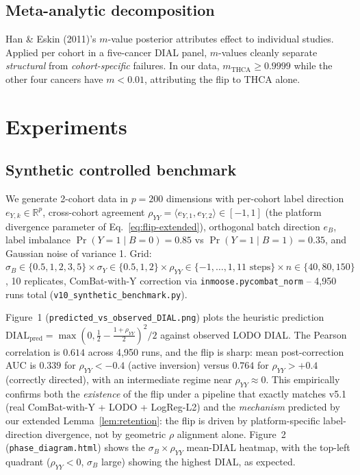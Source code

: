 \documentclass[letterpaper,11pt]{article}
\newcommand{\R}{\mathbb{R}}
\begin{document}
\subsection{Meta-analytic decomposition}
Han \& Eskin (2011)'s $m$-value posterior attributes effect to
individual studies.  Applied per cohort in a five-cancer DIAL panel,
$m$-values cleanly separate \emph{structural} from
\emph{cohort-specific} failures.  In our data,
$m_\text{THCA}\ge 0.9999$ while the other four cancers have
$m<0.01$, attributing the flip to THCA alone.

\section{Experiments}
\label{sec:exp}

\subsection{Synthetic controlled benchmark}
\label{sec:synth}
We generate 2-cohort data in $p=200$ dimensions with per-cohort
label direction $e_{Y,k}\in\R^{p}$, cross-cohort agreement
$\rho_{YY}=\langle e_{Y,1},e_{Y,2}\rangle\in[-1,1]$ (the platform
divergence parameter of Eq.~\eqref{eq:flip-extended}), orthogonal
batch direction $e_B$, label imbalance $\Pr(Y{=}1\mid B{=}0)=0.85$
vs $\Pr(Y{=}1\mid B{=}1)=0.35$, and Gaussian noise of variance 1.
Grid: $\sigma_B\in\{0.5,1,2,3,5\}\times\sigma_Y\in\{0.5,1,2\}\times
\rho_{YY}\in\{-1,\ldots,1,11\text{ steps}\}\times n\in\{40,80,150\}$,
10 replicates, ComBat-with-Y correction via
\texttt{inmoose.pycombat\_norm} -- 4{,}950 runs total
(\texttt{v10\_synthetic\_benchmark.py}).

Figure~1 (\texttt{predicted\_vs\_observed\_DIAL.png}) plots the
heuristic prediction $\mathrm{DIAL}_{\text{pred}}=\max(0,
\tfrac12-\tfrac{1+\rho_{YY}}{2})^2/2$ against observed LODO DIAL.
The Pearson correlation is $\mathbf{0.614}$ across 4{,}950 runs, and
the flip is sharp: mean post-correction AUC is $\mathbf{0.339}$ for
$\rho_{YY}<-0.4$ (active inversion) versus $\mathbf{0.764}$ for
$\rho_{YY}>+0.4$ (correctly directed), with an intermediate regime
near $\rho_{YY}\approx 0$. This empirically confirms both the
\emph{existence} of the flip under a pipeline that exactly matches
v5.1 (real ComBat-with-Y + LODO + LogReg-L2) and the
\emph{mechanism} predicted by our extended Lemma~\ref{lem:retention}:
the flip is driven by platform-specific label-direction divergence,
not by geometric $\rho$ alignment alone. Figure~2
(\texttt{phase\_diagram.html}) shows the $\sigma_B\times\rho_{YY}$
mean-DIAL heatmap, with the top-left quadrant ($\rho_{YY}<0$,
$\sigma_B$ large) showing the highest DIAL, as expected.
\end{document}
